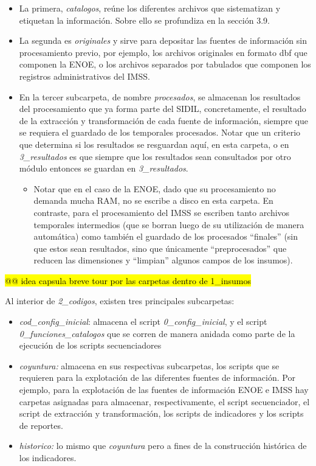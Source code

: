 \documentclass[
]{article}
\providecommand{\tightlist}{%
  \setlength{\itemsep}{0pt}\setlength{\parskip}{0pt}}
\begin{document}
\begin{itemize}
\item
  La primera, \emph{catalogos}, reúne los diferentes archivos que sistematizan y etiquetan la información. Sobre ello se profundiza en la sección 3.9.
\item
  La segunda es \emph{originales} y sirve para depositar las fuentes de información sin procesamiento previo, por ejemplo, los archivos originales en formato dbf que componen la ENOE, o los archivos separados por tabulados que componen los registros administrativos del IMSS.
\item
  En la tercer subcarpeta, de nombre \emph{procesados}, se almacenan los resultados del procesamiento que ya forma parte del SIDIL, concretamente, el resultado de la extracción y transformación de cada fuente de información, siempre que se requiera el guardado de los temporales procesados. Notar que un criterio que determina si los resultados se resguardan aquí, en esta carpeta, o en \emph{3\_resultados} es que siempre que los resultados sean consultados por otro módulo entonces se guardan en \emph{3\_resultados}.

  \begin{itemize}
  \tightlist
  \item
    Notar que en el caso de la ENOE, dado que su procesamiento no demanda mucha RAM, no se escribe a disco en esta carpeta. En contraste, para el procesamiento del IMSS se escriben tanto archivos temporales intermedios (que se borran luego de su utilización de manera automática) como también el guardado de los procesados ``finales'' (sin que estos sean resultados, sino que únicamente ``preprocesados'' que reducen las dimensiones y ``limpian'' algunos campos de los insumos).
  \end{itemize}
\end{itemize}

\hl{@@ idea capsula
breve tour por las carpetas dentro de 1\_insumos}

Al interior de \emph{2\_codigos}, existen tres principales subcarpetas:

\begin{itemize}
\item
  \emph{cod\_config\_inicial}: almacena el script \emph{0\_config\_inicial}, y el script \emph{0\_funciones\_catalogos} que se corren de manera anidada como parte de la ejecución de los scripts secuenciadores
\item
  \emph{coyuntura:} almacena en sus respectivas subcarpetas, los scripts que se requieren para la explotación de las diferentes fuentes de información. Por ejemplo, para la explotación de las fuentes de información ENOE e IMSS hay carpetas asignadas para almacenar, respectivamente, el script secuenciador, el script de extracción y transformación, los scripts de indicadores y los scripts de reportes.
\item
  \emph{historico:} lo mismo que \emph{coyuntura} pero a fines de la construcción histórica de los indicadores.
\end{itemize}
\end{document}
